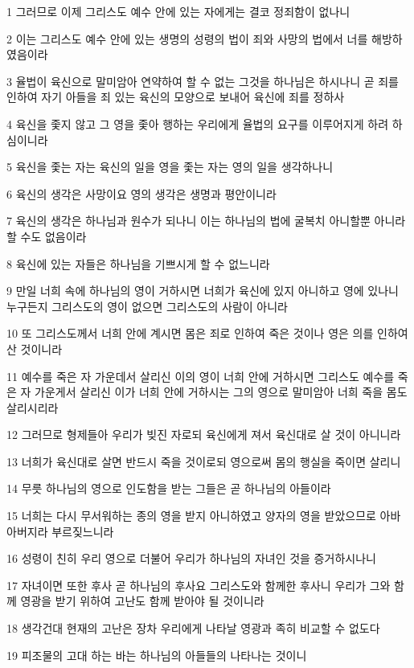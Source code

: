 \par 1 그러므로 이제 그리스도 예수 안에 있는 자에게는 결코 정죄함이 없나니
\par 2 이는 그리스도 예수 안에 있는 생명의 성령의 법이 죄와 사망의 법에서 너를 해방하였음이라
\par 3 율법이 육신으로 말미암아 연약하여 할 수 없는 그것을 하나님은 하시나니 곧 죄를 인하여 자기 아들을 죄 있는 육신의 모양으로 보내어 육신에 죄를 정하사
\par 4 육신을 좇지 않고 그 영을 좇아 행하는 우리에게 율법의 요구를 이루어지게 하려 하심이니라
\par 5 육신을 좇는 자는 육신의 일을 영을 좇는 자는 영의 일을 생각하나니
\par 6 육신의 생각은 사망이요 영의 생각은 생명과 평안이니라
\par 7 육신의 생각은 하나님과 원수가 되나니 이는 하나님의 법에 굴복치 아니할뿐 아니라 할 수도 없음이라
\par 8 육신에 있는 자들은 하나님을 기쁘시게 할 수 없느니라
\par 9 만일 너희 속에 하나님의 영이 거하시면 너희가 육신에 있지 아니하고 영에 있나니 누구든지 그리스도의 영이 없으면 그리스도의 사람이 아니라
\par 10 또 그리스도께서 너희 안에 계시면 몸은 죄로 인하여 죽은 것이나 영은 의를 인하여 산 것이니라
\par 11 예수를 죽은 자 가운데서 살리신 이의 영이 너희 안에 거하시면 그리스도 예수를 죽은 자 가운게서 살리신 이가 너희 안에 거하시는 그의 영으로 말미암아 너희 죽을 몸도 살리시리라
\par 12 그러므로 형제들아 우리가 빚진 자로되 육신에게 져서 육신대로 살 것이 아니니라
\par 13 너희가 육신대로 살면 반드시 죽을 것이로되 영으로써 몸의 행실을 죽이면 살리니
\par 14 무릇 하나님의 영으로 인도함을 받는 그들은 곧 하나님의 아들이라
\par 15 너희는 다시 무서워하는 종의 영을 받지 아니하였고 양자의 영을 받았으므로 아바 아버지라 부르짖느니라
\par 16 성령이 친히 우리 영으로 더불어 우리가 하나님의 자녀인 것을 증거하시나니
\par 17 자녀이면 또한 후사 곧 하나님의 후사요 그리스도와 함께한 후사니 우리가 그와 함께 영광을 받기 위하여 고난도 함께 받아야 될 것이니라
\par 18 생각건대 현재의 고난은 장차 우리에게 나타날 영광과 족히 비교할 수 없도다
\par 19 피조물의 고대 하는 바는 하나님의 아들들의 나타나는 것이니

